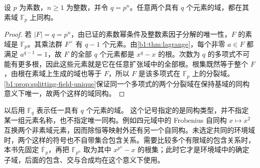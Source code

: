 \begin{theorem}\label{b1:thm:finite-field-unique}
	设 \(p\) 为素数，\(n\geq1\) 为整数，并令 \(q=p^n\)。任意两个具有 \(q\) 个元素的域，都在其素域 \(\mathbb F_p\) 上同构。
\end{theorem}
\begin{proof}
	若 \(|F|=q=p^n\)，由已证的素数幂条件及整数素因子分解的唯一性，\(F\) 的素域是 \(\mathbb F_p\)。其乘法群 \(F^\times\) 有 \(q-1\) 个元素。由\cref{b1:thm:lagrange}，每个非零 \(a\in F\) 都满足 \(a^{q-1}=1\)，故 \(F\) 的全部 \(q\) 个元素都是 \(x^q-x\) 的根。次数为 \(q\) 的多项式不可能有更多根，因此这些元素就是它在任意扩张域中的全部根。根集既然等于整个 \(F\)，由根在素域上生成的域也等于 \(F\)，所以 \(F\) 是该多项式在 \(\mathbb F_p\) 上的分裂域。\cref{b1:prop:splitting-field-unique}保证同一个多项式的两个分裂域在保持基域的同构意义下唯一，故两个这样的域同构。
\end{proof}
以后用 \(\mathbb F_q\) 表示任一具有 \(q\) 个元素的域。
这个记号指定的是同构类型，并不指定某一组元素名称，也不指定唯一同构。例如四元域中的 Frobenius 自同构 \(x\mapsto x^2\) 互换两个非素域元素，因而除恒等映射外还有另一个自同构。未选定共同的环境域时，两个这样的符号也不自带集合包含关系。需要比较多个有限域的包含关系时，本书先固定 \(\overline{\mathbb F}_p\)，再把 \(\mathbb F_{p^n}\) 取为其中 \(x^{p^n}-x\) 的根集；此时它才是环境域中的确定子域，后面的包含、交与合成均在这个意义下使用。
